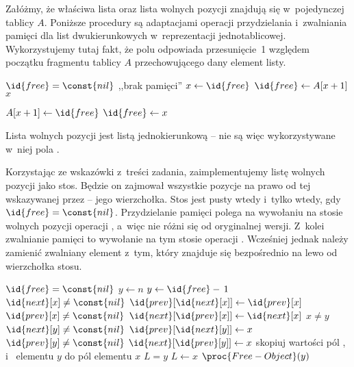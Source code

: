 \exercise %
Załóżmy, że właściwa lista oraz lista wolnych pozycji znajdują się w~pojedynczej tablicy $A$. Poniższe procedury są adaptacjami operacji przydzielania i~zwalniania pamięci dla list dwukierunkowych w~reprezentacji jednotablicowej. Wykorzystujemy tutaj fakt, że polu  odpowiada przesunięcie~1 względem początku fragmentu tablicy $A$ przechowującego dany element listy.
\begin{codebox}
\li	\If $\id{free}=\const{nil}$
\li		\Then \Error ,,brak pamięci''
		\End
\li	$x\gets\id{free}$
\li	$\id{free}\gets A[x+1]$
\li	\Return $x$
\end{codebox}

\begin{codebox}
\li	$A[x+1]\gets\id{free}$
\li	$\id{free}\gets x$
\end{codebox}

\exercise %
Lista wolnych pozycji jest listą jednokierunkową -- nie są więc wykorzystywane w~niej pola .

\exercise %
Korzystając ze wskazówki z~treści zadania, zaimplementujemy listę wolnych pozycji jako stos. Będzie on zajmował wszystkie pozycje na prawo od tej wskazywanej przez  -- jego wierzchołka. Stos jest pusty wtedy i~tylko wtedy, gdy $\id{free}=\const{nil}$. Przydzielanie pamięci polega na wywołaniu na stosie wolnych pozycji operacji , a~więc nie różni się od oryginalnej wersji. Z~kolei zwalnianie pamięci to wywołanie na tym stosie operacji . Wcześniej jednak należy zamienić zwalniany element z~tym, który znajduje się bezpośrednio na lewo od wierzchołka stosu.
\begin{codebox}
\li	\If $\id{free}=\const{nil}$
\li		\Then $y\gets n$
\li		\Else $y\gets\id{free}-\,1$
		\End
\li	\If $\id{next}[x]\ne\const{nil}$
\li		\Then $\id{prev}[\id{next}[x]]\gets\id{prev}[x]$
		\End
\li	\If $\id{prev}[x]\ne\const{nil}$
\li		\Then $\id{next}[\id{prev}[x]]\gets\id{next}[x]$
		\End
\li	\If $x\ne y$
\li		\Then
			\If $\id{next}[y]\ne\const{nil}$
\li				\Then $\id{prev}[\id{next}[y]]\gets x$
				\End
\li			\If $\id{prev}[y]\ne\const{nil}$
\li				\Then $\id{next}[\id{prev}[y]]\gets x$
				\End
		\End
\li	skopiuj wartości pól ,  i~ elementu $y$ do pól elementu $x$
\li	\If $L=y$
\li		\Then $L\gets x$
		\End
\li	$\proc{Free-Object}(y)$
\end{codebox}

